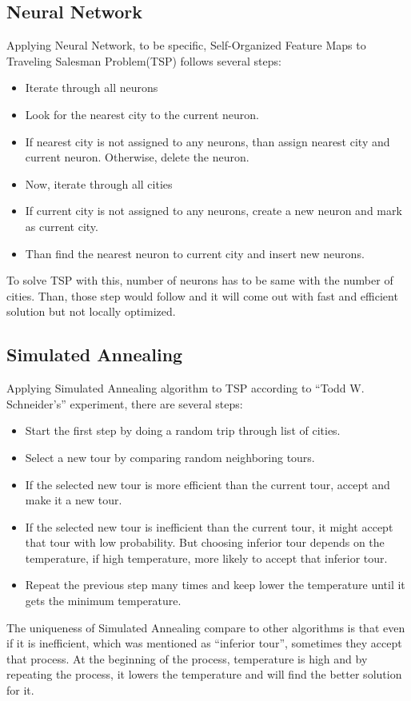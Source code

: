 \documentclass[12pt]{article}
\begin{document}
\subsection*{Neural Network}
\noindent Applying Neural Network, to be specific, Self-Organized Feature Maps to Traveling Salesman Problem(TSP) follows several steps: \cite{SOM}
\begin{itemize}
\item Iterate through all neurons
\item Look for the nearest city to the current neuron.
\item If nearest city is not assigned to any neurons, than assign nearest city and current neuron. Otherwise, delete the neuron.
\item Now, iterate through all cities
\item If current city is not assigned to any neurons, create a new neuron and mark as current city.
\item Than find the nearest neuron to current city and insert new neurons.
\end{itemize}
To solve TSP with this, number of neurons has to be  same with the number of cities. Than, those step would follow and it will come out with fast and efficient solution but not locally optimized. 
\subsection*{Simulated Annealing}
\noindent Applying Simulated Annealing algorithm to TSP according to \enquote{Todd W. Schneider's}\cite{SimulatedAnnealing} experiment, there are several steps:
\begin{itemize}
\item Start the first step by doing a random trip through list of cities.
\item Select a new tour by comparing random neighboring tours.
\item If the selected new tour is more efficient than the current tour, accept and make it a new tour. 
\item If the selected new tour is inefficient than the current tour, it might accept that tour with low probability. But choosing inferior tour depends on the temperature, if high temperature, more likely to accept that inferior tour.
\item Repeat the previous step many times and keep lower the temperature until it gets the minimum temperature.
\end{itemize}
The uniqueness of Simulated Annealing compare to other algorithms is that even if it is inefficient, which was mentioned as \enquote{inferior tour}, sometimes they accept that process. At the beginning of the process, temperature is high and by repeating the process, it lowers the temperature and will find the better solution for it.
\end{document}
